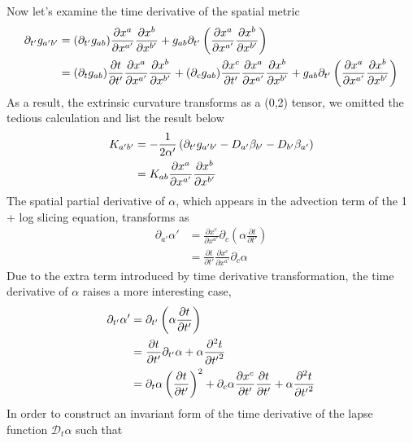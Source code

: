 \documentclass[letterpaper,nofootinbib,prd,amsmath,onecolumn]{revtex4-1}
\begin{document}
Now let's examine the time derivative of the spatial metric
\begin{align}
\partial_{t'}g_{a'b'} & = (\partial_{t'}g_{ab})\frac{\partial x^{a}}{\partial x^{a'}}\frac{\partial x^{b}}{\partial x^{b'}} + g_{ab}\partial_{t'}\left(\frac{\partial x^{a}}{\partial x^{a'}}\frac{\partial x^{b}}{\partial x^{b'}}\right)\notag\\
& =  (\partial_{t}g_{ab})\frac{\partial t}{\partial t'}\frac{\partial x^{a}}{\partial x^{a'}}\frac{\partial x^{b}}{\partial x^{b'}} + (\partial_{c}g_{ab})\frac{\partial x^{c}}{\partial t'}\frac{\partial x^{a}}{\partial x^{a'}}\frac{\partial x^{b}}{\partial x^{b'}} + g_{ab}\partial_{t'}\left(\frac{\partial x^{a}}{\partial x^{a'}}\frac{\partial x^{b}}{\partial x^{b'}}\right)
\end{align}
As a result, the extrinsic curvature transforms as a (0,2) tensor, we omitted the tedious calculation and list the result below
\begin{align}
K_{a'b'} & = -\frac{1}{2\alpha'}\left(\partial_{t'}g_{a'b'} - D_{a'}\beta_{b'} - D_{b'}\beta_{a'}\right)\notag\\
& = K_{ab}\frac{\partial x^{a}}{\partial x^{a'}}\frac{\partial x^{b}}{\partial x^{b'}}
\end{align}
The spatial partial derivative of $\alpha$, which appears in the advection term of the 1 + log slicing equation, transforms as 
\begin{align}
\partial_{a'}\alpha' & = \frac{\partial x^{c}}{\partial x^{a'}}\partial_{c}\left(\alpha \frac{\partial t}{\partial t'}\right)\\
& = \frac{\partial t}{\partial t'}\frac{\partial x^{c}}{\partial x^{a'}}\partial_{c}\alpha
\end{align}
Due to the extra term introduced by time derivative transformation, the time derivative of $\alpha$ raises a more interesting case, 
\begin{align}
\partial_{t'}\alpha' & = \partial_{t'}\left(\alpha\frac{\partial t}{\partial t'}\right)\notag\\
& = \frac{\partial t}{\partial t'}\partial_{t'}\alpha + \alpha\frac{\partial^{2}t}{\partial {t'}^{2}}\notag\\
& = \partial_{t}\alpha\left(\frac{\partial t}{\partial t'}\right)^{2} + \partial_{c}\alpha\frac{\partial x^{c}}{\partial t'}\frac{\partial t}{\partial t'} + \alpha\frac{\partial^{2}t}{\partial {t'}^{2}}
\end{align}
In order to construct an invariant form of the time derivative of the lapse function $\mathscr{D}_{t}\alpha$ such that
\end{document}
